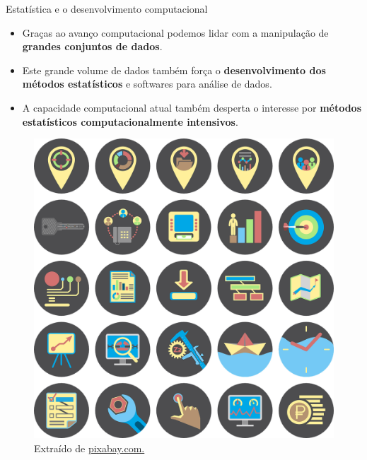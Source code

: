 \documentclass[
  ignorenonframetext,
  serif,
  professionalfont,
  usenames,
  dvipsnames,
  aspectratio = 169]{beamer}
\def\beginAHalfColumn{\begin{minipage}{0.49\textwidth}}%
\def\endColumns{\end{minipage}}%
\begin{document}
\begin{frame}{Estatística e o desenvolvimento computacional}
\protect\hypertarget{estatuxedstica-e-o-desenvolvimento-computacional-1}{}
\beginAHalfColumn

\begin{itemize}
\item
  Graças ao avanço computacional podemos lidar com a manipulação de
  \textbf{grandes conjuntos de dados}.
\item
  Este grande volume de dados também força o
  \textbf{desenvolvimento dos métodos estatísticos} e softwares para
  análise de dados.
\item
  A capacidade computacional atual também desperta o interesse por
  \textbf{métodos estatísticos computacionalmente intensivos}.
\end{itemize}

\endColumns
\beginAHalfColumn

\begin{figure}

{\centering \includegraphics[width=0.6\linewidth]{./img/ti} 

}

\caption{Extraído de \href{https://cdn.pixabay.com/photo/2015/04/14/23/17/it-business-722950_1280.png}{pixabay.com.}}\label{fig:unnamed-chunk-3}
\end{figure}

\endColumns
\end{frame}
\end{document}
